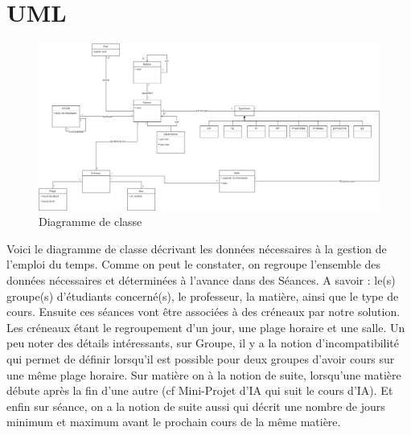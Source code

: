 \section{UML}
\begin{center}
	\begin{figure}[t]
	   \caption{\label{1} Diagramme de classe}
	   \includegraphics[keepaspectratio=true,width=17cm]{diagrammeClasse.png}
	\end{figure}
\end{center}
Voici le diagramme de classe décrivant les données nécessaires à la gestion de l'emploi du temps.
Comme on peut le constater, on regroupe l'ensemble des données nécessaires et déterminées à l'avance dans des Séances. A savoir : le(s) groupe(s) d'étudiants concerné(s), le professeur, la matière, ainsi que le type de cours. Ensuite ces séances vont être associées à des créneaux par notre solution. Les créneaux étant le regroupement d'un jour, une plage horaire et une salle.
Un peu noter des détails intéressants, sur Groupe, il y a la notion d'incompatibilité qui permet de définir lorsqu'il est possible pour deux groupes d'avoir cours sur une même plage horaire. Sur matière on à la notion de suite, lorsqu'une matière débute après la fin d'une autre (cf Mini-Projet d'IA qui suit le cours d'IA). Et enfin sur séance, on a la notion de suite aussi qui décrit une nombre de jours minimum et maximum avant le prochain cours de la même matière.